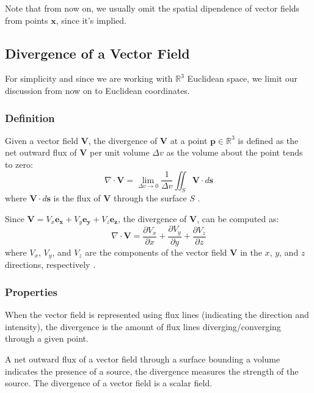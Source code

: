 \noindent
Note that from now on, we usually omit the spatial dipendence of vector fields
from points $\mathbf{x}$, since it's implied.

\subsection{Divergence of a Vector Field}
For simplicity and since we are working with \(\mathbb{R}^3\) Euclidean space, we 
limit our discussion from now on to Euclidean coordinates.

\subsubsection{Definition}
Given a vector field \(\mathbf{V}\), the divergence of \(\mathbf{V}\) at a point 
\( \mathbf{p} \in \mathbb{R}^3 \) is defined as the net outward flux of 
\(\mathbf{V}\) per unit volume \(\Delta v\) as the volume about the point tends 
to zero:
\begin{equation}
\nabla \cdot \mathbf{V} = \lim_{\Delta v \to 0} \frac{1}{\Delta v} \iint_S 
\mathbf{V} \cdot d\mathbf{s}
\label{eq:divergence}
\end{equation}
where \( \mathbf{V} \cdot d\mathbf{s} \) is the flux of \( \mathbf{V} \) through 
the surface \(S\) \cite{book-magnetism}.

Since \(\mathbf{V} = V_{x} \mathbf{e_x} + V_{y} \mathbf{e_y} + V_{z} 
\mathbf{e_z}\), the divergence of \(\mathbf{V}\), can be computed as:
\begin{equation}
\nabla \cdot \mathbf{V} = \frac{\partial V_{x}}{\partial x} + \frac{\partial 
V_{y}}{\partial y} + \frac{\partial V_{z}}{\partial z}
\end{equation}
where \(V_{x}\), \(V_{y}\), and \(V_{z}\) are the components of the vector field 
\(\mathbf{V}\) in the \(x\), \(y\), and \(z\) directions, respectively 
\cite{math-book}.

\subsubsection{Properties}
When the vector field is represented using flux lines (indicating the direction 
and intensity), the divergence is the amount of flux lines diverging/converging 
through a given point.

A net outward flux of a vector field through a surface bounding a volume 
indicates the presence of a source, the divergence measures the strength of the 
source. The divergence of a vector field is a scalar field. 

